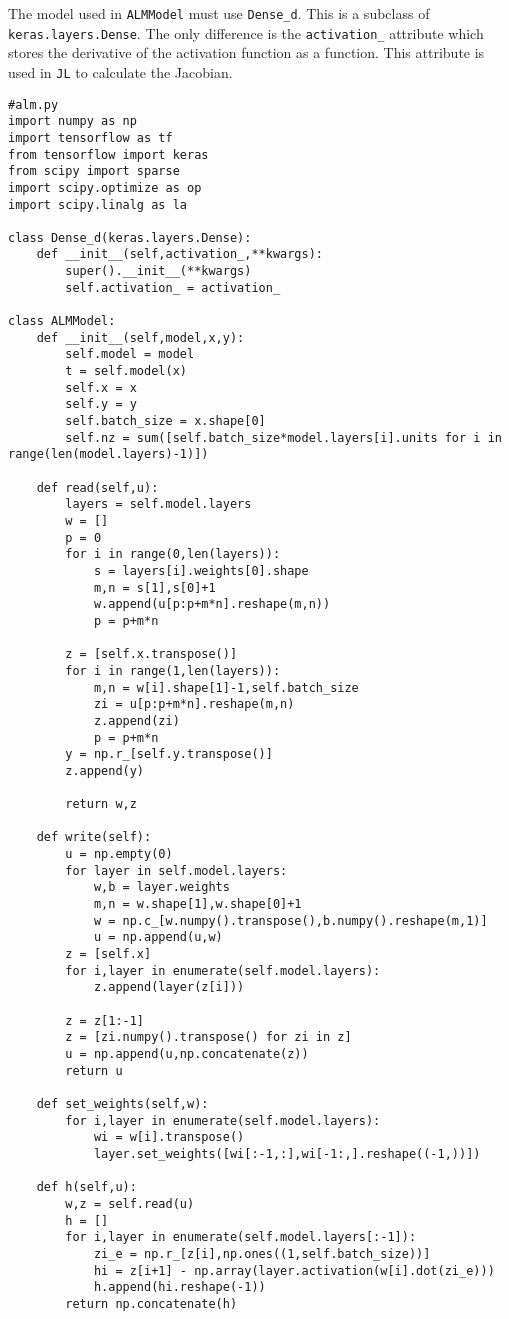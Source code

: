 The model used in \texttt{ALMModel} must use \texttt{Dense\_d}. This is a subclass of \texttt{keras.layers.Dense}. The only difference is the \texttt{activation\_} attribute which stores the derivative of the activation function as a function. This attribute is used in \texttt{JL} to calculate the Jacobian.
\begin{verbatim}
#alm.py
import numpy as np
import tensorflow as tf
from tensorflow import keras
from scipy import sparse
import scipy.optimize as op
import scipy.linalg as la

class Dense_d(keras.layers.Dense):
    def __init__(self,activation_,**kwargs):
        super().__init__(**kwargs)
        self.activation_ = activation_

class ALMModel:
    def __init__(self,model,x,y):
        self.model = model
        t = self.model(x)
        self.x = x
        self.y = y
        self.batch_size = x.shape[0]
        self.nz = sum([self.batch_size*model.layers[i].units for i in range(len(model.layers)-1)])

    def read(self,u):
        layers = self.model.layers
        w = []
        p = 0
        for i in range(0,len(layers)):
            s = layers[i].weights[0].shape
            m,n = s[1],s[0]+1
            w.append(u[p:p+m*n].reshape(m,n))
            p = p+m*n

        z = [self.x.transpose()]
        for i in range(1,len(layers)):
            m,n = w[i].shape[1]-1,self.batch_size
            zi = u[p:p+m*n].reshape(m,n)
            z.append(zi)
            p = p+m*n
        y = np.r_[self.y.transpose()]
        z.append(y)

        return w,z
    
    def write(self):
        u = np.empty(0)
        for layer in self.model.layers:
            w,b = layer.weights
            m,n = w.shape[1],w.shape[0]+1
            w = np.c_[w.numpy().transpose(),b.numpy().reshape(m,1)]
            u = np.append(u,w)
        z = [self.x]
        for i,layer in enumerate(self.model.layers):
            z.append(layer(z[i]))

        z = z[1:-1]
        z = [zi.numpy().transpose() for zi in z] 
        u = np.append(u,np.concatenate(z))
        return u

    def set_weights(self,w):
        for i,layer in enumerate(self.model.layers):
            wi = w[i].transpose()
            layer.set_weights([wi[:-1,:],wi[-1:,].reshape((-1,))])

    def h(self,u):
        w,z = self.read(u)
        h = []
        for i,layer in enumerate(self.model.layers[:-1]):
            zi_e = np.r_[z[i],np.ones((1,self.batch_size))]
            hi = z[i+1] - np.array(layer.activation(w[i].dot(zi_e)))
            h.append(hi.reshape(-1))
        return np.concatenate(h)


\end{verbatim}
